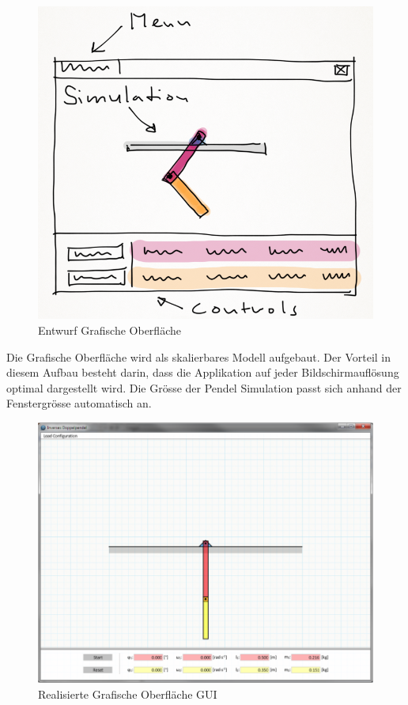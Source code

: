 \documentclass[12pt]{article}
\numberwithin{equation}{subsection}
\begin{document}
\begin{figure}[H]
	\centering
	\includegraphics[width=\textwidth]{software_draft.png}
	\caption{Entwurf Grafische Oberfläche}
	\label{fig:gui:draft}
\end{figure}

Die Grafische Oberfläche wird als skalierbares Modell aufgebaut. Der Vorteil in diesem Aufbau besteht darin, dass die Applikation auf jeder Bildschirmauflösung optimal dargestellt wird. Die Grösse der Pendel Simulation passt sich anhand der Fenstergrösse automatisch an.

\begin{figure}[H]
	\centering
	\includegraphics[width=\textwidth]{software_final.png}
	\caption{Realisierte Grafische Oberfläche GUI}
	\label{fig:xml}
\end{figure}
\end{document}
